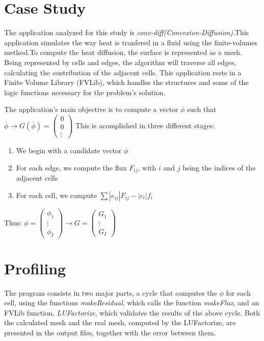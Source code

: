 \documentclass[a4paper,10pt,openright,openbib,twocolumn]{article}
\begin{document}
\section{Case Study}    %

The application analyzed for this study is \emph{conv-diff(Convexion-Diffusion)}.This application simulates the way heat is tranfered in a fluid using the finite-volumes method.To compute the heat diffusion, the surface is represented as a mesh. Being represented by cells and edges, the algorithm will traverse all edges, calculating the contribution of the adjacent cells. This application rests in a Finite Volume Library (FVLib), which handles the structures and some of the logic functions necessary for the problem's solution.

The application's main objective is to compute a vector $\overline{\phi}$ such that $\overline{\phi} \longrightarrow G(\overline{\phi}) = \left(\begin{array}{c}
0\\ 
0\\
\vdots\end{array}\right)$
This is acomplished in three different stages:
\begin{enumerate}
    \item {We begin with a candidate vector $\phi$} 
    \item {For each edge, we compute the flux $F_{ij}$, with $i$ and $j$ being the indices of the adjacent cells}
    \item {For each cell, we compute $\sum |e_{ij}| F_{ij} - |c_i| f_i$}
\end{enumerate}
Thus: $\phi = \left(\begin{array}{c}
\phi_1\\
\vdots\\
\phi_I
\end{array}\right) \longrightarrow G = \left(\begin{array}{c}
G_1\\
\vdots\\
G_I
\end{array}\right)$


\section{Profiling}    %

The program consists in two major parts, a cycle that computes the $\phi$ for each cell, using the functions \emph{makeResidual}, which calls the function \emph{makeFlux}, and an FVLib function, \emph{LUFactorize}, which validates the results of the above cycle. Both the calculated mesh and the real mesh, computed by the LUFactorize, are presented in the output files, together with the error between them.
 
\end{document}
